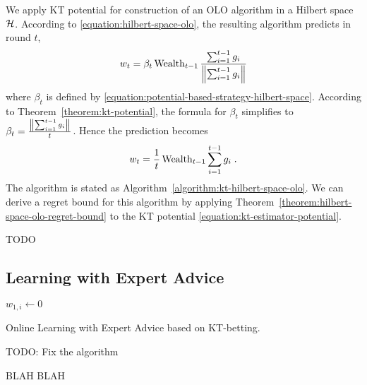 We apply KT potential for construction of an OLO algorithm in a Hilbert
space $\mathcal{H}$. According to \eqref{equation:hilbert-space-olo}, the resulting algorithm predicts
in round $t$,
$$
w_t = \beta_t \operatorname{Wealth}_{t-1} \frac{\sum_{i=1}^{t-1} g_i}{\left\|{\sum_{i=1}^{t-1} g_i}\right\|}
$$
where $\beta_t$ is defined by \eqref{equation:potential-based-strategy-hilbert-space}.
According to Theorem~\ref{theorem:kt-potential}, the formula for $\beta_t$ simplifies to
$\beta_t = \frac{\left\|{\sum_{i=1}^{t-1} g_i}\right\|}{t}$. Hence the prediction becomes
$$
w_t = \frac{1}{t} \operatorname{Wealth}_{t-1} \sum_{i=1}^{t-1} g_i \; .
$$
The algorithm is stated as Algorithm~\ref{algorithm:kt-hilbert-space-olo}. We
can derive a regret bound for this algorithm by applying
Theorem~\ref{theorem:hilbert-space-olo-regret-bound} to the KT potential
\eqref{equation:kt-estimator-potential}.

\begin{corollary}
TODO
\end{corollary}

\subsection{Learning with Expert Advice}

\begin{algorithm}
\begin{algorithmic}
{
 $w_{1,i} \leftarrow 0$
  \ENDFOR
  }
  \end{algorithmic}
  \caption{Online Learning with Expert Advice based on \ac{KT}-betting.}
  \label{algorithm:kt-experts}
\end{algorithm}

TODO: Fix the algorithm

BLAH BLAH
